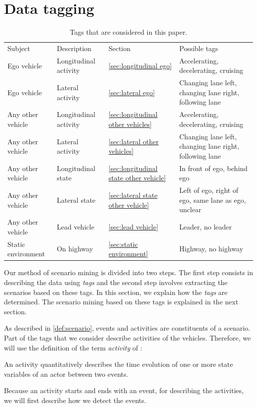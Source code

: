 \section{Data tagging}
\label{sec:tagging}

\begin{table}
	\cstarta
	\centering
	\caption{\cstarta Tags that are considered in this paper.\cenda}
	\label{tab:tags}
	\begin{tabular}{llll}
		\toprule
		Subject & Description & Section & Possible tags \\ \otoprule
		Ego vehicle & Longitudinal activity & \cref{sec:longitudinal ego} & Accelerating, decelerating, cruising \\
		Ego vehicle & Lateral activity & \cref{sec:lateral ego} & Changing lane left, changing lane right, following lane \\
		Any other vehicle & Longitudinal activity & \cref{sec:longitudinal other vehicles} & Accelerating, decelerating, cruising \\
		Any other vehicle & Lateral activity & \cref{sec:lateral other vehicles} & Changing lane left, changing lane right, following lane \\
		Any other vehicle & Longitudinal state & \cref{sec:longitudinal state other vehicle} & In front of ego, behind ego \\
		Any other vehicle & Lateral state & \cref{sec:lateral state other vehicle} & Left of ego, right of ego, same lane as ego, unclear \\
		Any other vehicle & Lead vehicle & \cref{sec:lead vehicle} & Leader, no leader \\
		Static environment & On highway & \cref{sec:static environment} & Highway, no highway \\ 
		\bottomrule
	\end{tabular}
	\cenda
\end{table}

\cstarta
Our method of scenario mining is divided into two steps. 
The first step consists in describing the data using \emph{tags} and the second step involves extracting the scenarios based on these tags. 
In this section, we explain how the \emph{tags} are determined. 
The scenario mining based on these tags is explained in the next section.

As described in \cref{def:scenario}, events and activities are constituents of a scenario. 
Part of the tags that we consider describe activities of the vehicles.
Therefore, we will use the definition of the term \emph{activity} of \autocite{degelder2018ontology}:\cenda
\begin{definition}[Activity]
	\label{def:activity}
	An activity quantitatively describes the time evolution of one or more state variables of an actor between two events.
\end{definition}
Because an activity starts and ends with an event, for describing the activities, we will first describe how we detect the events.

